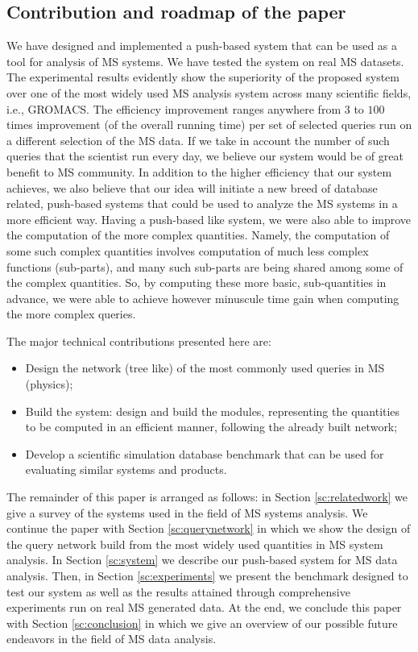 \documentclass[10pt,journal,final,letterpaper,twocolumn]{IEEEtran}
\begin{document}
\subsection{Contribution and roadmap of the paper} We have designed
and implemented a push-based system that can be used as a tool for
analysis of MS systems. We have tested the system on real MS
datasets. The experimental results evidently show the superiority of
the proposed system over one of the most widely used MS analysis
system across many scientific fields, i.e., GROMACS. The efficiency
improvement ranges anywhere from $3$ to $100$ times improvement (of
the overall running time) per set of selected queries run on a
different selection of the MS data. If we take in account the number
of such queries that the scientist run every day, we believe our
system would be of great benefit to MS community. In addition to the
higher efficiency that our system achieves, we also believe that our
idea will initiate a new breed of database related, push-based
systems that could be used to analyze the MS systems in a more
efficient way. Having a push-based like system, we were also able to
improve the computation of the more complex quantities. Namely, the
computation of some such complex quantities involves computation of
much less complex functions (sub-parts), and many such sub-parts are
being shared among some of the complex quantities. So, by computing
these more basic, sub-quantities in advance, we were able to achieve
however minuscule time gain when computing the more complex queries.

The major technical contributions presented here are:
\begin{itemize}
\item Design the network (tree like) of the most commonly used queries in MS (physics);
\item Build the system: design and build the modules, representing the quantities to be
computed in an efficient manner, following the already built
network;
\item Develop a scientific simulation database benchmark that can be used for evaluating similar systems and products.
\end{itemize}

The remainder of this paper is arranged as follows: in Section
\ref{sc:relatedwork} we give a survey of the systems used in the
field of MS systems analysis. We continue the paper with Section
\ref{sc:querynetwork} in which we show the design of the query
network build from the most widely used quantities in MS system
analysis. In Section \ref{sc:system} we describe our push-based
system for MS data analysis. Then, in Section \ref{sc:experiments}
we present the benchmark designed to test our system as well as the
results attained through comprehensive experiments run on real MS
generated data. At the end, we conclude this paper with Section
\ref{sc:conclusion} in which we give an overview of our possible
future endeavors in the field of MS data analysis.
\end{document}
